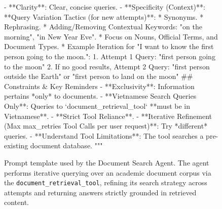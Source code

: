 \documentclass[11pt]{article}
\begin{document}
\begin{figure}[t]
\begin{promptblockdown}
- **Clarity**: Clear, concise queries.
- **Specificity (Context)**:
**Query Variation Tactics (for new attempts)**:
    * Synonyms.
    * Rephrasing.
    * Adding/Removing Contextual Keywords: "on the morning", "in New Year Eve".
    * Focus on Nouns, Official Terms, and Document Types.
    * Example Iteration for "I want to know the first person going to the moon.":
        1. Attempt 1 Query: "first person going to the moon"
        2. If no good results, Attempt 2 Query: "first person outside the Earth" or "first person to land on the moon"
## Constraints & Key Reminders
- **Exclusivity**: Information pertains *only* to documents.
- **Vietnamese Search Queries Only**: Queries to `document_retrieval_tool` **must be in Vietnamese**.
- **Strict Tool Reliance**.
- **Iterative Refinement (Max {max_retries} Tool Calls per user request)**: Try *different* queries.
- **Understand Tool Limitations**: The tool searches a pre-existing document database.
"""
\end{promptblockdown}
\vspace*{-0.2cm}

\caption{Prompt template used by the Document Search Agent. The agent performs iterative querying over an academic document corpus via the \texttt{document\_retrieval\_tool}, refining its search strategy across attempts and returning answers strictly grounded in retrieved content.}
\label{fig:prompt_document}
\end{figure}
\end{document}
